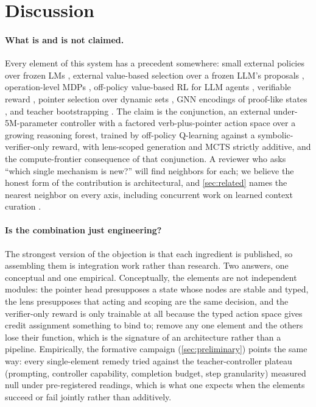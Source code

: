 \section{Discussion}
\label{sec:discussion}

\paragraph{What is and is not claimed.} Every element of this system has a
precedent somewhere: small external policies over frozen LMs
\citep{rlprompt, tempera}, external value-based selection over a frozen
LLM's proposals \citep{dialogxpert}, operation-level MDPs \citep{gsos},
off-policy value-based RL for LLM agents \citep{archer, oreo}, verifiable
reward \citep{deepseekr1, tulu3}, pointer selection over dynamic sets
\citep{pointernets}, GNN encodings of proof-like states
\citep{paliwal2020graph, graph2tac}, and teacher bootstrapping
\citep{dqfd, alphago}. The claim is the conjunction, an external
under-5M-parameter controller with a factored verb-plus-pointer action
space over a growing reasoning forest, trained by off-policy Q-learning
against a symbolic-verifier-only reward, with lens-scoped generation and
MCTS strictly additive, and the compute-frontier consequence of that
conjunction. A reviewer who asks ``which single mechanism is new?'' will
find neighbors for each; we believe the honest form of the contribution is
architectural, and \cref{sec:related} names the nearest neighbor on every
axis, including concurrent work on learned context curation
\citep{contextcuration}.

\paragraph{Is the combination just engineering?} The strongest version of
the objection is that each ingredient is published, so assembling them is
integration work rather than research. Two answers, one conceptual and
one empirical. Conceptually, the elements are not independent modules:
the pointer head presupposes a state whose nodes are stable and typed,
the lens presupposes that acting and scoping are the same decision, and
the verifier-only reward is only trainable at all because the typed
action space gives credit assignment something to bind to; remove any one
element and the others lose their function, which is the signature of an
architecture rather than a pipeline. Empirically, the formative campaign
(\cref{sec:preliminary}) points the same way: every single-element remedy
tried against the teacher-controller plateau (prompting, controller
capability, completion budget, step granularity) measured null under
pre-registered readings, which is what one expects when the elements
succeed or fail jointly rather than additively.

